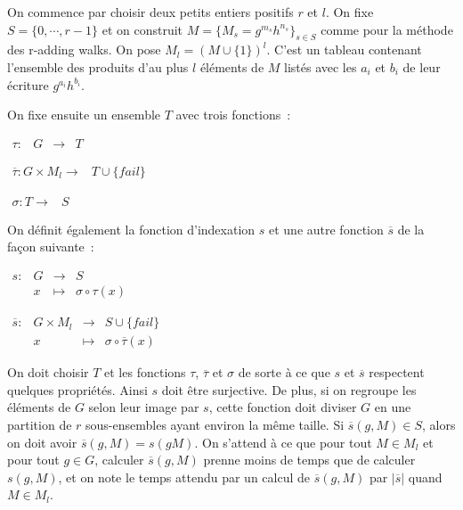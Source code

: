       On commence par choisir deux petits entiers positifs $r$ et $l$. On fixe $S=\{0,\cdots,r-1\}$ et on construit $M=\{M_s = g^{m_s} h^{n_s}\}_{s \in S}$ comme pour la méthode des r-adding walks. On pose $M_l = (M\cup\{1\})^l$. C'est un tableau contenant l'ensemble des produits d'au plus $l$ éléments de $M$ listés avec les $a_i$ et $b_i$ de leur écriture $g^{a_i} h^{b_i}$.

      On fixe ensuite un ensemble $T$ avec trois fonctions~:

      $\begin{array}{lrcl}
        \tau : & G & \longrightarrow & T
      \end{array}$

      $\begin{array}{lrcl}
        \overline{\tau} : G \times M_l \longrightarrow & T \cup \{fail\}
      \end{array}$

      $\begin{array}{lrcl}
        \sigma : T \longrightarrow & S
      \end{array}$

      On définit également la fonction d'indexation $s$ et une autre fonction $\overline{s}$ de la façon suivante~:

      $\begin{array}{lrcl}
        s : & G & \longrightarrow & S \\
            & x & \longmapsto & \sigma \circ \tau (x)
      \end{array}$

      $\begin{array}{lrcl}
        \overline{s} : & G \times M_l & \longrightarrow & S \cup \{fail\} \\
                       & x & \longmapsto & \sigma \circ \overline{\tau} (x)
      \end{array}$

      On doit choisir $T$ et les fonctions $\tau$, $\overline{\tau}$ et $\sigma$ de sorte à ce que $s$ et $\overline{s}$ respectent quelques propriétés. Ainsi $s$ doit être surjective. De plus, si on regroupe les éléments de $G$ selon leur image par $s$, cette fonction doit diviser $G$ en une partition de $r$ sous-ensembles ayant environ la même taille. Si $\overline{s}(g,M) \in S$, alors on doit avoir $\overline{s}(g,M) = s(g M)$. On s'attend à ce que pour tout $M \in M_l$ et pour tout $g \in G$, calculer $\overline{s}(g,M)$ prenne moins de temps que de calculer $s(g,M)$, et on note le temps attendu par un calcul de $\overline{s}(g,M)$ par $|\overline{s}|$ quand $M \in M_l$.

